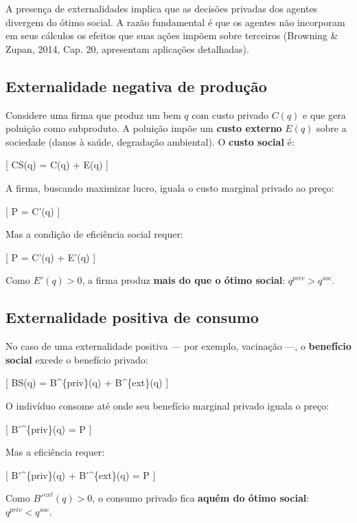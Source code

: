 \documentclass[11pt,twoside,openright]{book}
\begin{document}
A presença de externalidades implica que as decisões privadas dos
agentes divergem do ótimo social. A razão fundamental é que os agentes
não incorporam em seus cálculos os efeitos que suas ações impõem sobre
terceiros (Browning \& Zupan, 2014, Cap. 20, apresentam aplicações
detalhadas).

\subsection{Externalidade negativa de
produção}\label{externalidade-negativa-de-produuxe7uxe3o}

Considere uma firma que produz um bem \(q\) com custo privado \(C(q)\) e
que gera poluição como subproduto. A poluição impõe um \textbf{custo
externo} \(E(q)\) sobre a sociedade (danos à saúde, degradação
ambiental). O \textbf{custo social} é:

{[} CS(q) = C(q) + E(q) \label{eq:20.3}  {]}

A firma, buscando maximizar lucro, iguala o custo marginal privado ao
preço:

{[} P = C'(q) \quad {} {]}

Mas a condição de eficiência social requer:

{[} P = C'(q) + E'(q) \quad {} \label{eq:20.4}
 {]}

Como \(E'(q) > 0\), a firma produz \textbf{mais do que o ótimo social}:
\(q^{priv} > q^{soc}\).

\subsection{Externalidade positiva de
consumo}\label{externalidade-positiva-de-consumo}

No caso de uma externalidade positiva --- por exemplo, vacinação ---, o
\textbf{benefício social} excede o benefício privado:

{[} BS(q) = B\^{}\{priv\}(q) + B\^{}\{ext\}(q) {]}

O indivíduo consome até onde seu benefício marginal privado iguala o
preço:

{[} B'\^{}\{priv\}(q) = P \label{eq:20.5}  {]}

Mas a eficiência requer:

{[} B'\^{}\{priv\}(q) + B'\^{}\{ext\}(q) = P \label{eq:20.6} 
{]}

Como \(B'^{ext}(q) > 0\), o consumo privado fica \textbf{aquém do ótimo
social}: \(q^{priv} < q^{soc}\).
\end{document}
